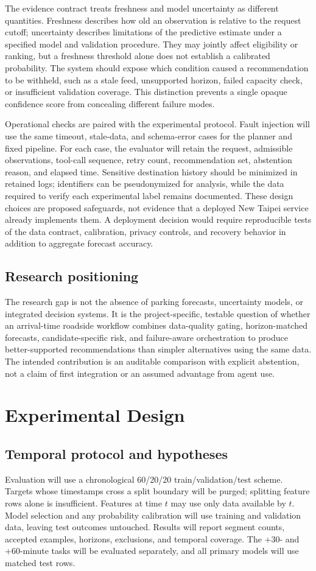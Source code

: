\documentclass[conference,letterpaper,10pt]{IEEEtran}
\begin{document}
The evidence contract treats freshness and model uncertainty as different quantities. Freshness describes how old an observation is relative to the request cutoff; uncertainty describes limitations of the predictive estimate under a specified model and validation procedure. They may jointly affect eligibility or ranking, but a freshness threshold alone does not establish a calibrated probability. The system should expose which condition caused a recommendation to be withheld, such as a stale feed, unsupported horizon, failed capacity check, or insufficient validation coverage. This distinction prevents a single opaque confidence score from concealing different failure modes.

Operational checks are paired with the experimental protocol. Fault injection will use the same timeout, stale-data, and schema-error cases for the planner and fixed pipeline. For each case, the evaluator will retain the request, admissible observations, tool-call sequence, retry count, recommendation set, abstention reason, and elapsed time. Sensitive destination history should be minimized in retained logs; identifiers can be pseudonymized for analysis, while the data required to verify each experimental label remains documented. These design choices are proposed safeguards, not evidence that a deployed New Taipei service already implements them. A deployment decision would require reproducible tests of the data contract, calibration, privacy controls, and recovery behavior in addition to aggregate forecast accuracy.

\subsection{Research positioning}
The research gap is not the absence of parking forecasts, uncertainty models, or integrated decision systems. It is the project-specific, testable question of whether an arrival-time roadside workflow combines data-quality gating, horizon-matched forecasts, candidate-specific risk, and failure-aware orchestration to produce better-supported recommendations than simpler alternatives using the same data. The intended contribution is an auditable comparison with explicit abstention, not a claim of first integration or an assumed advantage from agent use.

\section{Experimental Design}
\subsection{Temporal protocol and hypotheses}
Evaluation will use a chronological 60/20/20 train/validation/test scheme. Targets whose timestamps cross a split boundary will be purged; splitting feature rows alone is insufficient. Features at time $t$ may use only data available by $t$. Model selection and any probability calibration will use training and validation data, leaving test outcomes untouched. Results will report segment counts, accepted examples, horizons, exclusions, and temporal coverage. The +30- and +60-minute tasks will be evaluated separately, and all primary models will use matched test rows.
\end{document}
